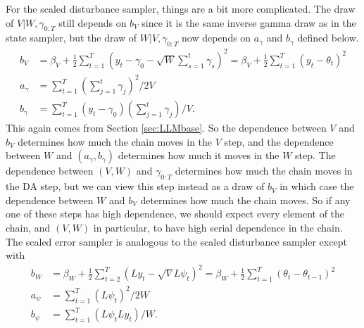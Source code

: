 \documentclass{article}
\begin{document}
For the scaled disturbance sampler, things are a bit more complicated. The draw of $V|W,\gamma_{0:T}$ still depends on $b_V$ since it is the same inverse gamma draw as in the state sampler, but the draw of $W|V,\gamma_{0:T}$ now depends on $a_\gamma$ and $b_\gamma$ defined below.
\begin{align*}
  b_V &= \beta_V + \frac{1}{2}\sum_{t=1}^T\left(y_t - \gamma_0 - \sqrt{W}\sum_{s=1}^t\gamma_{s}\right)^2 = \beta_V + \frac{1}{2}\sum_{t=1}^T(y_t - \theta_t)^2\\
  a_\gamma & = \sum_{t=1}^T\left(\sum_{j=1}^t\gamma_j\right)^2/2V\\
  b_\gamma &=\sum_{t=1}^T(y_t-\gamma_0)\left(\sum_{j=1}^t\gamma_j\right)/V.
\end{align*}
This again comes from Section \ref{sec:LLMbase}. So the dependence between $V$ and $b_V$ determines how much the chain moves in the $V$ step, and the dependence between $W$ and $(a_\gamma , b_\gamma)$ determines how much it moves in the $W$ step. The dependence between $(V,W)$ and $\gamma_{0:T}$ determines how much the chain moves in the DA step, but we can view this step instead as a draw of $b_V$ in which case the dependence between $W$ and $b_V$ determines how much the chain moves. So if any one of these steps has high dependence, we should expect every element of the chain, and $(V,W)$ in particular, to have high serial dependence in the chain. The scaled error sampler is analogous to the scaled disturbance sampler except with 
\begin{align*}
  b_W &= \beta_W + \frac{1}{2}\sum_{t=2}^T\left(Ly_t - \sqrt{V}L\psi_t\right)^2 = \beta_W + \frac{1}{2}\sum_{t=1}^T(\theta_t - \theta_{t-1})^2\\
  a_\psi&=\sum_{t=1}^T(L\psi_t)^2/2W\\
  b_\psi&=\sum_{t=1}^T(L\psi_tLy_t)/W.
\end{align*}
\end{document}
